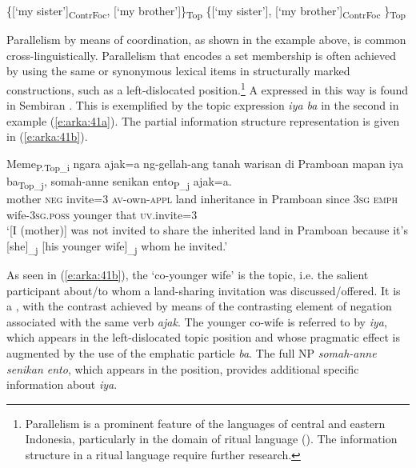 \documentclass[output=paper
,modfonts
,nonflat]{langsci/langscibook}
\begin{document}
\begin{exe}
	\ex\label{e:arka:40}
	\begin{xlist}
		\label{e40i} \{[‘my sister’]\textsubscript{ContrFoc}, [‘my brother’]\}\textsubscript{Top}
		\label{e40ii} \{[‘my sister’], [‘my brother’]\textsubscript{ContrFoc} \}\textsubscript{Top}
	\end{xlist}
\end{exe}

\noindent
Parallelism by means of coordination, as shown in the  example above, is common cross-linguistically. Parallelism that encodes a  set membership is often achieved by using the same or synonymous lexical items in structurally marked constructions, such as a left-dislocated position.\footnote{Parallelism is a prominent feature of the languages of central and eastern Indonesia, particularly in the domain of ritual language (\citealt{Fox1988,Grimes1997,Kuipers1998,Arka2010,Sumitri2016}). The information structure in a ritual language require further research.}  A  expressed in this way is found in Sembiran . This is exemplified by the topic expression \textit{iya ba} in the second  in example (\ref{e:arka:41a}). The partial information structure representation is given in (\ref{e:arka:41b}).

\begin{exe}
	\ex\label{e:arka:41}
	\begin{xlist}
		\ex\label{e:arka:41a}
		\gll {\ob}Meme{\cb}\textsubscript{P.Top\_i}  ngara   ajak=a  ng-{\USOParen}g{\USCParen}ellah-ang tanah   warisan   di Pramboan  mapan {\ob}iya   ba{\cb}\textsubscript{Top\_j},  {\ob}somah-anne  senikan   ento{\cb}\textsubscript{P\_j}  ajak=a.\\
		\phantom{[}mother  \textsc{neg}   invite=3  \textsc{av}{}-own-\textsc{appl} land   inheritance   in  Pramboan  since \phantom{[}3\textsc{sg}   \textsc{emph}  \phantom{[}wife-3\textsc{sg.poss}  younger  that   \textsc{uv}.invite=3\\
		\glt ‘[I (mother)] was not invited to share the inherited land in
		Pramboan because it’s [she]\textsubscript{\_j} [his younger wife]\textsubscript{\_j} whom he invited.’
		\label{e:arka:41b}
	\end{xlist}
\end{exe}

\noindent
As seen in (\ref{e:arka:41b}), the ‘co-younger wife’ is the topic, i.e. the salient participant about/to whom a land-sharing invitation was discussed/offered. It is a , with the contrast achieved by means of the contrasting element of negation associated with the same verb \textit{ajak}. The younger co-wife is referred to by \textit{iya}, which appears in the left-dislocated topic position and whose pragmatic effect is augmented by the use of the emphatic particle \textit{ba}. The full NP \textit{somah-anne} \textit{senikan ento}, which appears in the  position, provides additional specific information about \textit{iya}.  
\end{document}
